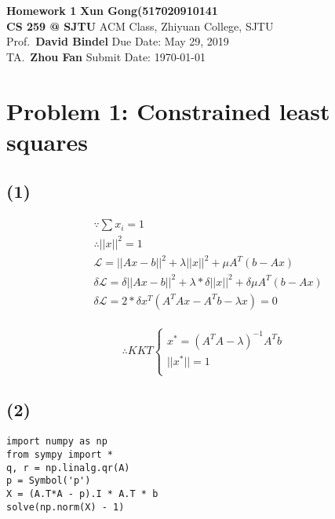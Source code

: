 \documentclass[a4paper, 11pt]{article}
\begin{document}
\noindent
\large \textbf{Homework 1} \hfill \textbf{Xun Gong(517020910141} \\
\normalsize {\bf CS 259 @ SJTU} \hfill ACM Class, Zhiyuan College, SJTU\\
Prof.~{\bf David Bindel} \hfill Due Date: May 29, 2019\\
TA.~{\bf Zhou Fan} \hfill Submit Date: \today

\section*{Problem 1: Constrained least squares}

\subsection*{(1)}

\begin{align*}
&\because \sum x_i = 1 \\
&\therefore || x ||^2 = 1 \\
&\mathcal{L} = ||Ax - b||^2 + \lambda ||x||^2 + \mu A^T (b - Ax) \\
&\delta \mathcal{L} = \delta ||Ax - b||^2 + \lambda * \delta ||x||^2 + \delta \mu A^T (b - Ax)\\
&\delta \mathcal{L} = 2*\delta x^T (A^T A x - A^T b - \lambda x) = 0\\
\end{align*}

$$\therefore KKT 
\begin{cases}
    x^* = (A^T A - \lambda)^{-1} A^T b \\
    ||x^*|| = 1 \\
\end{cases}$$

\subsection*{(2)}

\begin{lstlisting}
import numpy as np
from sympy import *
q, r = np.linalg.qr(A)
p = Symbol('p')
X = (A.T*A - p).I * A.T * b
solve(np.norm(X) - 1)
\end{lstlisting}
\end{document}
